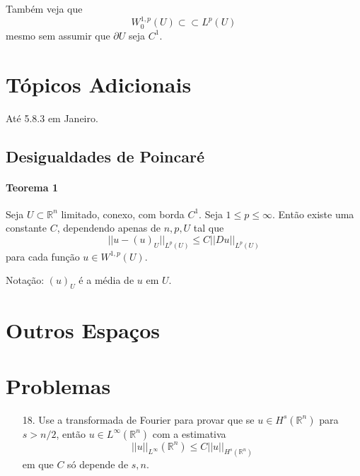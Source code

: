 \documentclass[11pt]{article}
\newcommand{\Rn}{{\mathbb{R}^n}}
\newcommand{\pu}{\partial U}
\begin{document}
Também veja que \[W^{1,p}_0(U) \subset\subset L^p(U)\] mesmo sem assumir que $\pu$ seja $C^1$.



\section{Tópicos Adicionais}

Até 5.8.3 em Janeiro.


\subsection{Desigualdades de Poincaré}

\paragraph{Teorema 1}\label{t:sobolev-poincare-t1} Seja \(U \subset \mathbb{R}^n \) limitado, conexo, com borda \(C^1\). Seja \(1 \leq p \leq \infty \). Então existe uma constante \(C\), dependendo apenas de \(n, p, U\) tal que \[ ||u- (u)_U ||_{L^p(U)} \leq C ||Du||_{L^p(U)} \] para cada função \(u \in W^{1,p}(U)\).

Notação: \((u)_U\) é a média de \(u\) em \(U\).

\section{Outros Espaços}

\section{Problemas}

\begin{enumerate}
	\item[18.] Use a transformada de Fourier para provar que se $u \in H^s(\Rn)$ para $s> n/2$, então $u \in L^{\infty}(\Rn)$ com a estimativa \[ ||u||_{L^\infty}(\Rn) \leq C ||u||_{H^s(\Rn)} \] em que $C$ só depende de $s,n$.
\end{enumerate}
\end{document}

